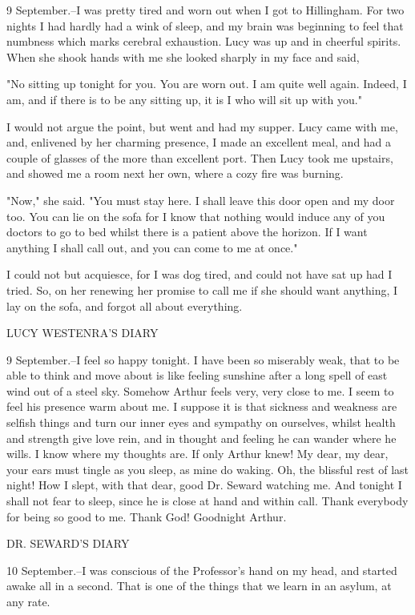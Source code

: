 9 September.--I was pretty tired and worn out when I got to Hillingham. For two nights I had hardly had a wink of sleep, and my brain was beginning to feel that numbness which marks cerebral exhaustion. Lucy was up and in cheerful spirits. When she shook hands with me she looked sharply in my face and said, 

"No sitting up tonight for you. You are worn out. I am quite well again. Indeed, I am, and if there is to be any sitting up, it is I who will sit up with you." 

I would not argue the point, but went and had my supper. Lucy came with me, and, enlivened by her charming presence, I made an excellent meal, and had a couple of glasses of the more than excellent port. Then Lucy took me upstairs, and showed me a room next her own, where a cozy fire was burning. 

"Now," she said. "You must stay here. I shall leave this door open and my door too. You can lie on the sofa for I know that nothing would induce any of you doctors to go to bed whilst there is a patient above the horizon. If I want anything I shall call out, and you can come to me at once." 

I could not but acquiesce, for I was dog tired, and could not have sat up had I tried. So, on her renewing her promise to call me if she should want anything, I lay on the sofa, and forgot all about everything. 

LUCY WESTENRA'S DIARY 

9 September.--I feel so happy tonight. I have been so miserably weak, that to be able to think and move about is like feeling sunshine after a long spell of east wind out of a steel sky. Somehow Arthur feels very, very close to me. I seem to feel his presence warm about me. I suppose it is that sickness and weakness are selfish things and turn our inner eyes and sympathy on ourselves, whilst health and strength give love rein, and in thought and feeling he can wander where he wills. I know where my thoughts are. If only Arthur knew! My dear, my dear, your ears must tingle as you sleep, as mine do waking. Oh, the blissful rest of last night! How I slept, with that dear, good Dr. Seward watching me. And tonight I shall not fear to sleep, since he is close at hand and within call. Thank everybody for being so good to me. Thank God! Goodnight Arthur. 

DR. SEWARD'S DIARY 

10 September.--I was conscious of the Professor's hand on my head, and started awake all in a second. That is one of the things that we learn in an asylum, at any rate. 

